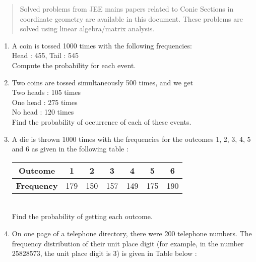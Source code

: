 \documentclass[journal,12pt,twocolumn]{IEEEtran}
\begin{document}
\begin{abstract}
	Solved problems from JEE mains papers related to Conic Sections in coordinate geometry are 
available in this document.  These problems are solved using linear algebra/matrix analysis.
\end{abstract}
\begin{enumerate}[label=\arabic*]
	
	\item A coin is tossed 1000 times with the following frequencies:\\
Head : 455, Tail : 545\\
Compute the probability for each event.\\
   \item Two coins are tossed simultaneously 500 times, and we get\\
       Two heads : 105 times\\
       One head : 275 times\\
       No head : 120 times\\
Find the probability of occurrence of each of these events.\\
   \item A die is thrown 1000 times with the frequencies for the outcomes 1, 2, 3, 4, 5 and 6 as given in the following table :\\

\begin{tabular}{ |c|c|c|c|c|c|c| } 
 \hline
 \textbf{Outcome} &1 &2 &3 &4 &5 &6  \\ 
 \hline
 \textbf{Frequency} &179 &150 &157 &149 &175 &190 \\ 
 \hline
\end{tabular}\\

Find the probability of getting each outcome.\\
   \item On one page of a telephone directory, there were 200 telephone numbers.
The frequency distribution of their unit place digit (for example, in the number 25828573, the unit place digit is 3) is given in Table below :\\

\\



\end{enumerate}
\end{document}
